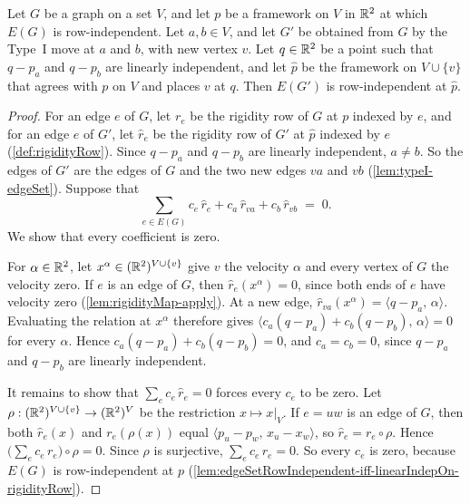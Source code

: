\begin{lemma}
  \label{lem:typeI-rowIndependent-extend}
  \leanok
  Let $G$ be a graph on a set $V$, and let $p$ be a framework on
  $V$ in ${\mathbb{R}}^{2}$ at which $E(G)$ is row-independent. Let $a, b \in V$,
  and let $G'$ be obtained from $G$ by the Type~I move at $a$ and $b$,
  with new vertex $v$. Let $q \in {\mathbb{R}}^{2}$ be a point such that
  $q - p_a$ and $q - p_b$ are linearly independent, and let $\hat p$ be
  the framework on $V \cup \{v\}$ that agrees with $p$ on $V$ and
  places $v$ at $q$. Then $E(G')$ is row-independent at $\hat p$.
\end{lemma}
\begin{proof}
  \leanok
  For an edge $e$ of $G$, let $r_e$ be the rigidity row of $G$ at $p$
  indexed by $e$, and for an edge $e$ of $G'$, let $\hat r_e$ be the
  rigidity row of $G'$ at $\hat p$ indexed by $e$
  (\cref{def:rigidityRow}). Since $q - p_a$ and $q - p_b$ are linearly
  independent, $a \ne b$. So the edges of $G'$ are the edges of $G$ and
  the two new edges $va$ and $vb$ (\cref{lem:typeI-edgeSet}). Suppose
  that
  \[
    \sum_{e \in E(G)} c_e\, \hat r_e + c_a\, \hat r_{va}
      + c_b\, \hat r_{vb} \;=\; 0.
  \]
  We show that every coefficient is zero.

  For $\alpha \in {\mathbb{R}}^{2}$, let $x^{\alpha} \in ({\mathbb{R}}^{2})^{V \cup \{v\}}$
  give $v$ the velocity $\alpha$ and every vertex of $G$ the velocity
  zero. If $e$ is an edge of $G$, then $\hat r_e(x^{\alpha}) = 0$,
  since both ends of $e$ have velocity zero
  (\cref{lem:rigidityMap-apply}). At a new edge,
  $\hat r_{va}(x^{\alpha}) = \langle q - p_a,\, \alpha \rangle$.
  Evaluating the relation at $x^{\alpha}$ therefore gives
  $\langle c_a (q - p_a) + c_b (q - p_b),\, \alpha \rangle = 0$ for
  every $\alpha$. Hence $c_a (q - p_a) + c_b (q - p_b) = 0$, and
  $c_a = c_b = 0$, since $q - p_a$ and $q - p_b$ are linearly
  independent.

  It remains to show that $\sum_e c_e\, \hat r_e = 0$ forces every
  $c_e$ to be zero. Let $\rho : ({\mathbb{R}}^{2})^{V \cup \{v\}} \to ({\mathbb{R}}^{2})^{V}$
  be the restriction $x \mapsto x|_V$. If $e = uw$ is an edge of $G$,
  then both $\hat r_e(x)$ and $r_e(\rho(x))$ equal
  $\langle p_u - p_w,\, x_u - x_w \rangle$, so
  $\hat r_e = r_e \circ \rho$. Hence
  $\bigl(\sum_e c_e\, r_e\bigr) \circ \rho = 0$. Since $\rho$ is
  surjective, $\sum_e c_e\, r_e = 0$. So every $c_e$ is zero, because
  $E(G)$ is row-independent at $p$
  (\cref{lem:edgeSetRowIndependent-iff-linearIndepOn-rigidityRow}).
\end{proof}

